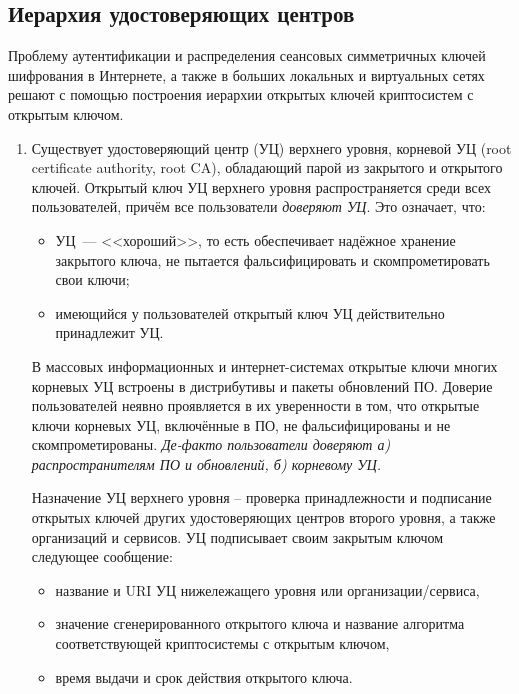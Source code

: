 \subsection{Иерархия удостоверяющих центров}\label{section-CAs}

Проблему аутентификации и распределения сеансовых симметричных ключей шифрования в Интернете, а также в больших локальных и виртуальных сетях решают с помощью построения иерархии открытых ключей криптосистем с открытым ключом.

\begin{enumerate}
    \item Существует удостоверяющий центр (УЦ) верхнего уровня, корневой УЦ (root certificate authority, root CA), обладающий парой из закрытого и открытого ключей. Открытый ключ УЦ верхнего уровня распространяется среди всех пользователей, причём все пользователи \emph{доверяют УЦ}. Это означает, что:
        \begin{itemize}
            \item УЦ~--- <<хороший>>, то есть обеспечивает надёжное хранение закрытого ключа, не пытается фальсифицировать и скомпрометировать свои ключи;
            \item имеющийся у пользователей открытый ключ УЦ действительно принадлежит УЦ.
        \end{itemize}
        В массовых информационных и интернет-системах открытые ключи многих корневых УЦ встроены в дистрибутивы и пакеты обновлений ПО. Доверие пользователей неявно проявляется в их уверенности в том, что открытые ключи корневых УЦ, включённые в ПО, не фальсифицированы и не скомпрометированы. \emph{Де-факто пользователи доверяют а) распространителям ПО и обновлений, б) корневому УЦ.}

        Назначение УЦ верхнего уровня -- проверка принадлежности и подписание открытых ключей других удостоверяющих центров второго уровня, а также организаций и сервисов. УЦ подписывает своим закрытым ключом следующее сообщение:
        \begin{itemize}
            \item название и URI УЦ нижележащего уровня или организации/сервиса,
            \item значение сгенерированного открытого ключа и название алгоритма соответствующей криптосистемы с открытым ключом,
            \item время выдачи и срок действия открытого ключа.
        \end{itemize}


\end{enumerate}
